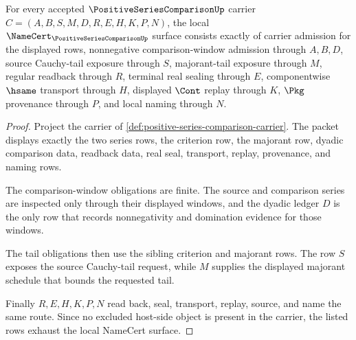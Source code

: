 \begin{theorem}
\label{thm:positive-series-comparison-namecert-obligations}
For every accepted $\PositiveSeriesComparisonUp$ carrier $C=(A,B,S,M,D,R,E,H,K,P,N)$, the local $\NameCert_{\PositiveSeriesComparisonUp}$ surface consists exactly of carrier admission for the displayed rows, nonnegative comparison-window admission through $A,B,D$, source Cauchy-tail exposure through $S$, majorant-tail exposure through $M$, regular readback through $R$, terminal real sealing through $E$, componentwise $\hsame$ transport through $H$, displayed $\Cont$ replay through $K$, $\Pkg$ provenance through $P$, and local naming through $N$.
\end{theorem}
\begin{proof}
Project the carrier of \autoref{def:positive-series-comparison-carrier}. The packet displays exactly the two series rows, the criterion row, the majorant row, dyadic comparison data, readback data, real seal, transport, replay, provenance, and naming rows.

The comparison-window obligations are finite. The source and comparison series are inspected only through their displayed windows, and the dyadic ledger $D$ is the only row that records nonnegativity and domination evidence for those windows.

The tail obligations then use the sibling criterion and majorant rows. The row $S$ exposes the source Cauchy-tail request, while $M$ supplies the displayed majorant schedule that bounds the requested tail.

Finally $R,E,H,K,P,N$ read back, seal, transport, replay, source, and name the same route. Since no excluded host-side object is present in the carrier, the listed rows exhaust the local NameCert surface.
\end{proof}

